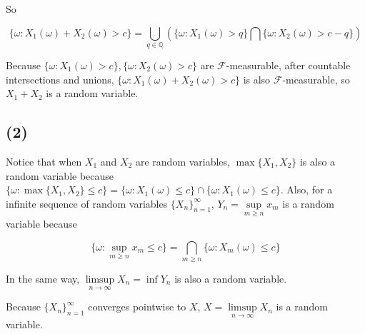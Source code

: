 \documentclass{article}
\begin{document}
So 

\begin{equation}
    \{\omega: X_1(\omega) +X_2(\omega) > c\} = \bigcup_{q \in \mathbb{Q}}\left(\{\omega: X_1(\omega)  > q\} \bigcap \{\omega: X_2(\omega)  > c-q\}\right)  
\end{equation}

Because $ \{\omega: X_1(\omega) > c\}, \{\omega: X_2(\omega) > c\}$ are  $\mathcal{F}$-measurable, after countable intersections and unions, $\{\omega: X_1(\omega) +X_2(\omega) > c\}$ is also $\mathcal{F}$-measurable, so $X_1+X_2$ is a random variable.


\subsection{(2)}

Notice that when $X_1$ and $X_2$ are random variables, $\max\{X_1,X_2\}$ is also a random variable because  $\{\omega: \max\{X_1,X_2\} \leqslant c\} = \{\omega: X_1(\omega) \leqslant c\} \cap \{\omega: X_1(\omega) \leqslant c\} $. Also, for a infinite sequence of random variables $\{X_n\}_{n=1}^{\infty}$, $Y_n = \underset{m \geqslant n}{\sup} x_{m}$ is a random variable because

\begin{equation}
    \{\omega: \sup_{m\geqslant n} x_{m} \leqslant c\} = \bigcap_{m\geqslant n }\{\omega: X_m(\omega) \leqslant c\} 
\end{equation}

In the same way, $\underset{n\to\infty}{\limsup} X_n = \inf {Y_n}$ is also a random variable.

Because $\{X_n\}_{n=1}^{\infty}$ converges pointwise to $X$, $X = \underset{n\to\infty}{\limsup} X_n$ is a random variable.

\end{document}

